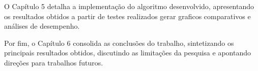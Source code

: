 O Capítulo 5 detalha a implementação do algoritmo desenvolvido, apresentando os resultados 
obtidos a partir de testes realizados gerar graficos comparativos e análises de desempenho.

Por fim, o Capítulo 6 consolida as conclusões do trabalho, sintetizando os principais 
resultados obtidos, discutindo as limitações da pesquisa e apontando direções para trabalhos futuros.





	

	

